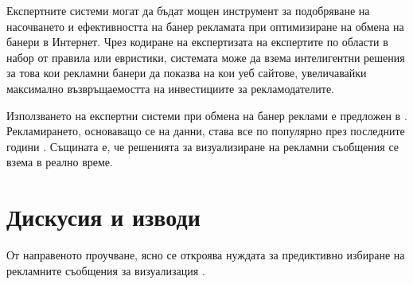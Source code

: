 Експертните системи могат да бъдат мощен инструмент за подобряване на насочването и ефективността на банер рекламата при оптимизиране на обмена на банери в Интернет. Чрез кодиране на експертизата на експертите по области в набор от правила или евристики, системата може да взема интелигентни решения за това кои рекламни банери да показва на кои уеб сайтове, увеличавайки максимално възвръщаемостта на инвестициите за рекламодателите.

Използването на експертни системи при обмена на банер реклами е предложен в \cite{Krasteleva_Soshnikov_2002}. Рекламирането, основаващо се на данни, става все по популярно през последните години \cite{Stange2014}. Същината е, че решенията за визуализиране на рекламни съобщения се взема в реално време.

\section{Дискусия и изводи}

От направеното проучване, ясно се откроява нуждата за предиктивно избиране на рекламните съобщения за визуализация \cite{doi:10.1089/big.2015.0006}. 

